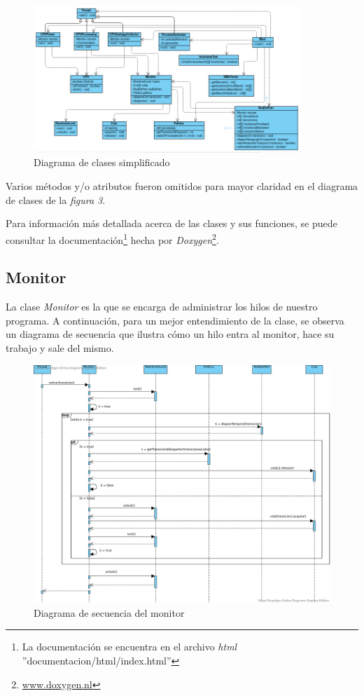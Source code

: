 \documentclass{article}
\newcommand{\fndoc}{La documentación se encuentra en el archivo \emph{html} ''documentacion/html/index.html''}
\newcommand{\fndoxy}{\url{www.doxygen.nl}}
\begin{document}
    \begin{figure}[H]
        \includegraphics[width=0.9\textwidth, center]{diagrama-clases.png}
        \caption{Diagrama de clases simplificado}
    \end{figure}
    Varios métodos y/o atributos fueron omitidos para mayor claridad en el diagrama de clases
    de la \emph{figura 3}. \par   
    Para información más detallada acerca de las clases y  sus funciones, se puede consultar
    la documentación\footnote{\fndoc} hecha por \emph{Doxygen}\footnote{\fndoxy}.
    \subsection{Monitor}
    La clase \emph{Monitor} es la que se encarga de administrar los hilos de nuestro programa.
    A continuación, para un mejor entendimiento de la clase, se observa un diagrama de secuencia
    que ilustra cómo un hilo entra al monitor, hace su trabajo y sale del mismo.
    \begin{figure}[H]
        \includegraphics[width=1.2\textwidth, center]{secuencia-monitor.png}
        \caption{Diagrama de secuencia del monitor}
    \end{figure}
\end{document}
